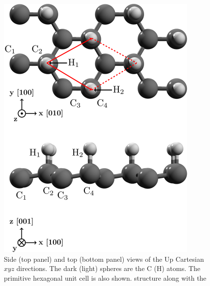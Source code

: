 \documentclass[floatfix,prb,aps,superscriptaddress,showpacs,11pt,preprint,letterpaper]{revtex4}
\def\tama{10cm}
\begin{document}
\begin{figure}[ht!]
    \centering
    \includegraphics[width=\tama]{figures/fig1}
    \caption{Side (top panel) and top (bottom panel) views of the Up
      Cartesian $xyz$ directions. The dark (light) spheres are the C (H) atoms. The primitive hexagonal unit cell is also shown.
      structure along with the 
}
    \label{fig:up-struc}
\end{figure}
\end{document}
